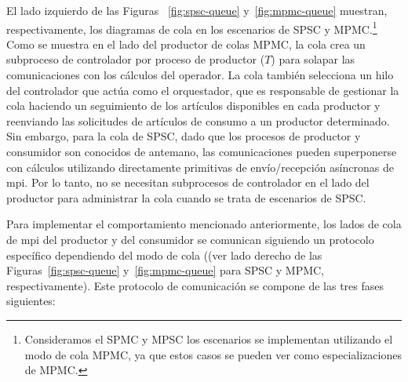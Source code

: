 El lado izquierdo de las Figuras ~\ref{fig:spsc-queue} y~\ref{fig:mpmc-queue} muestran, respectivamente, los diagramas de cola en los escenarios de SPSC y MPMC.\footnote{Consideramos el SPMC y MPSC los escenarios se implementan utilizando el modo de cola MPMC, ya que estos casos se pueden ver como especializaciones de MPMC.} Como se muestra en el lado del productor de colas MPMC, la cola crea un subproceso de controlador por proceso de productor ($T$) para solapar las comunicaciones con los cálculos del operador. La cola también selecciona un hilo del controlador que actúa como el orquestador, que es responsable de gestionar la cola haciendo un seguimiento de los artículos disponibles en cada productor y reenviando las solicitudes de artículos de consumo a un productor determinado. Sin embargo, para la cola de SPSC, dado que los procesos de productor y consumidor son conocidos de antemano, las comunicaciones pueden superponerse con cálculos utilizando directamente primitivas de envío/recepción asíncronas de \acrshort{mpi}. Por lo tanto, no se necesitan subprocesos de controlador en el lado del productor para administrar la cola cuando se trata de escenarios de SPSC.

Para implementar el comportamiento mencionado anteriormente, los lados de cola de \acrshort{mpi} del productor y del consumidor se comunican siguiendo un protocolo específico dependiendo del modo de cola ((ver lado derecho de las Figuras~\ref{fig:spsc-queue} y~\ref{fig:mpmc-queue} para SPSC y MPMC, respectivamente). Este protocolo de comunicación se compone de las tres fases siguientes:

